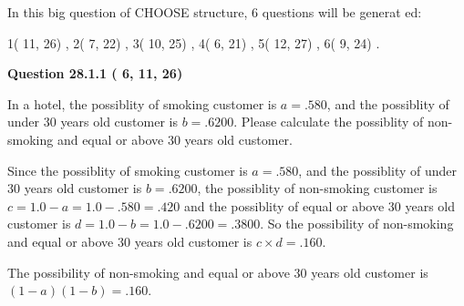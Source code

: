 \documentclass[12pt]{article}
\begin{document}
   
\vspace{0.2in}
   
 In this big question of CHOOSE structure,           6 questions will be generat
 ed: 
  
  
            1(         11,         26)
 ,
            2(          7,         22)
 ,
            3(         10,         25)
 ,
            4(          6,         21)
 ,
            5(         12,         27)
 ,
            6(          9,         24)
 .
  
\vspace{0.2in}
  
{\textbf{\Large{Question
28.1.1 
 (          6,         11,         26)
}}}
  
  
In a hotel, the possiblity of  %
smoking customer is
$a =  %
.580$, and the possiblity of  %
 under 30 years old customer is $ b =  %
.6200$.
Please calculate the possiblity of  %
 non-smoking and  %
equal or above 30 years old customer.
 
 
 
\noindent{}
 
 

Since the possiblity of  %
smoking customer is $ a =  %
.580 $,
and the possiblity of  %
 under 30 years old customer is $ b =  %
.6200 $,
the possiblity of  %
non-smoking customer is $ c = 1.0 - a = 1.0 -
.580
=  %
.420 $ and the possiblity of  %
equal or above 30 years old
customer is $ d = 1.0 - b = 1.0 -  %
.6200 =  %
.3800  $.
So the possibility of  %
 non-smoking and  %
equal or above 30 years old
customer is $ c \times d =  %
.160 $.
 
 
 
\noindent{}
 
 

 
 
 
\noindent{}
 
 

The possibility of  %
 non-smoking and  %
equal or above 30 years old
customer is $ (1-a)(1-b) =  %
.160 $.
 
 
\noindent{}
 
 

 
\vspace{0.3in}
   
\end{document}
